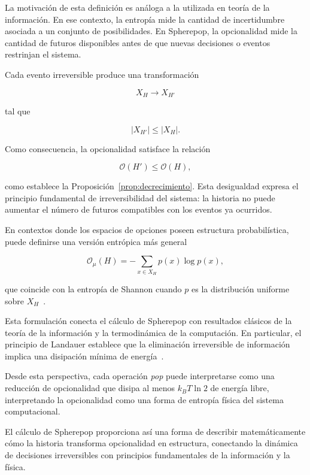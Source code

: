 \documentclass[12pt]{article}
\theoremstyle{plain}
\theoremstyle{definition}
\begin{document}
La motivación de esta definición es análoga a la utilizada en teoría de la información. En ese contexto, la entropía mide la cantidad de incertidumbre asociada a un conjunto de posibilidades. En Spherepop, la opcionalidad mide la cantidad de futuros disponibles antes de que nuevas decisiones o eventos restrinjan el sistema.

Cada evento irreversible produce una transformación

\[
X_H \rightarrow X_{H'}
\]

tal que

\[
|X_{H'}| \leq |X_H|.
\]

Como consecuencia, la opcionalidad satisface la relación

\[
\mathcal{O}(H') \leq \mathcal{O}(H),
\]

como establece la Proposición~\ref{prop:decrecimiento}. Esta desigualdad expresa el principio fundamental de irreversibilidad del sistema: la historia no puede aumentar el número de futuros compatibles con los eventos ya ocurridos.

En contextos donde los espacios de opciones poseen estructura probabilística, puede definirse una versión entrópica más general

\[
\mathcal{O}_\mu(H) =
- \sum_{x \in X_H} p(x)\log p(x),
\]

que coincide con la entropía de Shannon cuando $p$ es la distribución uniforme sobre $X_H$~\cite{shannon}.

Esta formulación conecta el cálculo de Spherepop con resultados clásicos de la teoría de la información y la termodinámica de la computación. En particular, el principio de Landauer establece que la eliminación irreversible de información implica una disipación mínima de energía~\cite{landauer,bennett}.

Desde esta perspectiva, cada operación \emph{pop} puede interpretarse como una reducción de opcionalidad que disipa al menos $k_B T \ln 2$ de energía libre, interpretando la opcionalidad como una forma de entropía física del sistema computacional.

El cálculo de Spherepop proporciona así una forma de describir matemáticamente cómo la historia transforma opcionalidad en estructura, conectando la dinámica de decisiones irreversibles con principios fundamentales de la información y la física.
\end{document}
